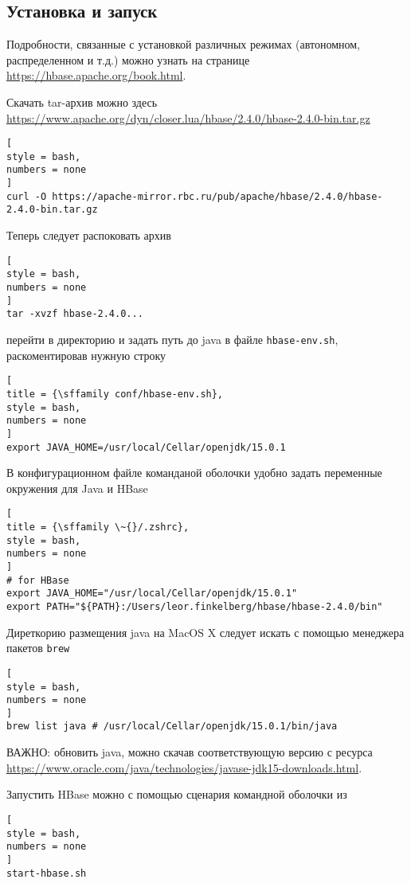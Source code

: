 \documentclass[%
	11pt,
	a4paper,
	utf8,
		]{article}
\begin{document}
\subsection{Установка и запуск}

Подробности, связанные с установкой различных режимах (автономном, распределенном и т.д.) можно узнать на странице \url{https://hbase.apache.org/book.html}.

Скачать tar-архив можно здесь \url{https://www.apache.org/dyn/closer.lua/hbase/2.4.0/hbase-2.4.0-bin.tar.gz}
\begin{lstlisting}[
style = bash,
numbers = none	
]
curl -O https://apache-mirror.rbc.ru/pub/apache/hbase/2.4.0/hbase-2.4.0-bin.tar.gz
\end{lstlisting}

Теперь следует распоковать архив
\begin{lstlisting}[
style = bash,
numbers = none	
]
tar -xvzf hbase-2.4.0...
\end{lstlisting}
перейти в директорию  и задать путь до java в файле \texttt{hbase-env.sh}, раскоментировав нужную строку
\begin{lstlisting}[
title = {\sffamily conf/hbase-env.sh},
style = bash,
numbers = none	
]
export JAVA_HOME=/usr/local/Cellar/openjdk/15.0.1
\end{lstlisting}

В конфигурационном файле команданой оболочки удобно задать переменные окружения для Java и HBase
\begin{lstlisting}[
title = {\sffamily \~{}/.zshrc},
style = bash,
numbers = none	
]
# for HBase
export JAVA_HOME="/usr/local/Cellar/openjdk/15.0.1"
export PATH="${PATH}:/Users/leor.finkelberg/hbase/hbase-2.4.0/bin"
\end{lstlisting}

Диреткорию размещения java на MacOS X следует искать с помощью менеджера пакетов \texttt{brew}
\begin{lstlisting}[
style = bash,
numbers = none
]
brew list java # /usr/local/Cellar/openjdk/15.0.1/bin/java
\end{lstlisting}

ВАЖНО: обновить java, можно скачав соответствующую версию с ресурса \url{https://www.oracle.com/java/technologies/javase-jdk15-downloads.html}.

Запустить HBase можно с помощью сценария командной оболочки из 
\begin{lstlisting}[
style = bash,
numbers = none	
]
start-hbase.sh
\end{lstlisting}
\end{document}

